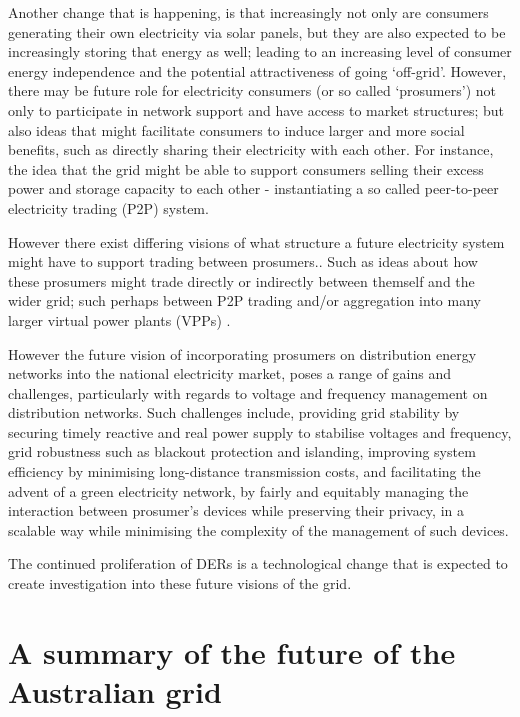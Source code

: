 Another change that is happening, is that increasingly not only are consumers generating their own electricity via solar panels, but they are also expected to be increasingly storing that energy as well; leading to an increasing level of consumer energy independence and the potential attractiveness of going `off-grid'.
However, there may be future role for electricity consumers (or so called `prosumers') not only to participate in network support and have access to market structures; but also ideas that might facilitate consumers to induce larger and more social benefits, such as directly sharing their electricity with each other.
For instance, the idea that the grid might be able to support consumers selling their excess power and storage capacity to each other - instantiating a so called peer-to-peer electricity trading (P2P) system.

However there exist differing visions of what structure a future electricity system might have to support trading between prosumers.\cite{Parag2016}.
Such as ideas about how these prosumers might trade directly or indirectly between themself and the wider grid; such perhaps between P2P trading and/or aggregation into many larger virtual power plants (VPPs) \cite{Morstyn2018}.

However the future vision of incorporating prosumers on distribution energy networks into the national electricity market, poses a range of gains and challenges, particularly with regards to voltage and frequency management on distribution networks.
Such challenges include, providing grid stability by securing timely reactive and real power supply to stabilise voltages and frequency, grid robustness such as blackout protection and islanding, improving system efficiency by minimising long-distance transmission costs, and facilitating the advent of a green electricity network, by fairly and equitably managing the interaction between prosumer's devices while preserving their privacy, in a scalable way while minimising the complexity of the management of such devices. \cite{BELL2018765}

The continued proliferation of DERs is a technological change that is expected to create investigation into these future visions of the grid.

\section{A summary of the future of the Australian grid}


